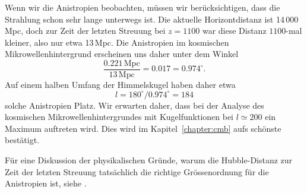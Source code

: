 Wenn wir die Anistropien beobachten, müssen wir berücksichtigen, dass
die Strahlung schon sehr lange unterwegs ist.
Die aktuelle Horizontdistanz ist 14\,000\,Mpc, doch zur Zeit der
letzten Streuung bei $z=1100$ war diese Distanz $1100$-mal kleiner,
also nur etwa 13\,Mpc.
Die Anistropien im kosmischen Mikrowellenhintergrund erscheinen uns
daher unter dem Winkel
\[
\frac{0.221\,\text{Mpc}}{13\,\text{Mpc}}
=
0.017
=
0.974^\circ.
\]
Auf einem halben Umfang der Himmelskugel haben daher etwa
\[
l=180^\circ\!/0.974^\circ = 184
\]
solche Anistropien Platz.
Wir erwarten daher, dass bei der Analyse des kosmischen
Mikrowellenhintergrundes mit Kugelfunktionen bei $l\simeq 200$
ein Maximum auftreten wird.
Dies wird im Kapitel~\ref{chapter:cmb} aufs schönste bestätigt.

Für eine Diskussion der physikalischen Gründe, warum die Hubble-Distanz
zur Zeit der letzten Streuung tatsächlich die richtige Grössenordnung
für die Anistropien ist,
siehe \cite{skript:ryden}.




